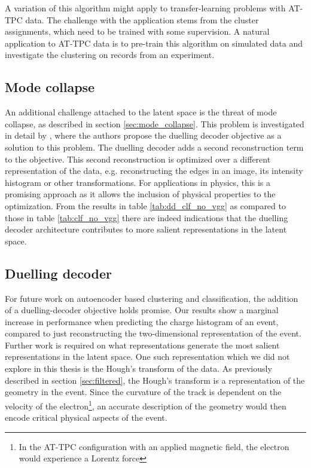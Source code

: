A variation of this algorithm might apply to transfer-learning problems with AT-TPC data. The challenge with the application stems from the cluster assignments, which need to be trained with some supervision. A natural application to AT-TPC data is to pre-train this algorithm on simulated data and investigate the clustering on records from an experiment. 

\subsection{Mode collapse}

An additional challenge attached to the latent space is the threat of mode collapse, as described in section \ref{sec:mode_collapse}. This problem is investigated in detail by \citet{Seybold2019}, where the authors propose the duelling decoder objective as a solution to this problem. The duelling decoder adds a second reconstruction term to the objective. This second reconstruction is optimized over a different representation of the data, e.g. reconstructing the edges in an image, its intensity histogram or other transformations. For applications in physics, this is a promising approach as it allows the inclusion of physical properties to the optimization. From the results in table \ref{tab:dd_clf_no_vgg} as compared to those in table \ref{tab:clf_no_vgg} there are indeed indications that the duelling decoder architecture contributes to more salient representations in the latent space. 

\subsection{Duelling decoder}

For future work on autoencoder based clustering and classification, the addition of a duelling-decoder objective holds promise. Our results show a marginal increase in performance when predicting the charge histogram of an event, compared to just reconstructing the two-dimensional representation of the event. Further work is required on what representations generate the most salient representations in the latent space. One such representation which we did not explore in this thesis is the Hough's transform of the data. As previously described in section \ref{sec:filtered}, the Hough's transform is a representation of the geometry in the event. Since the curvature of the track is dependent on the velocity of the electron\footnote{In the AT-TPC configuration with an applied magnetic field, the electron would experience a Lorentz force}, an accurate description of the geometry would then encode critical physical aspects of the event.


